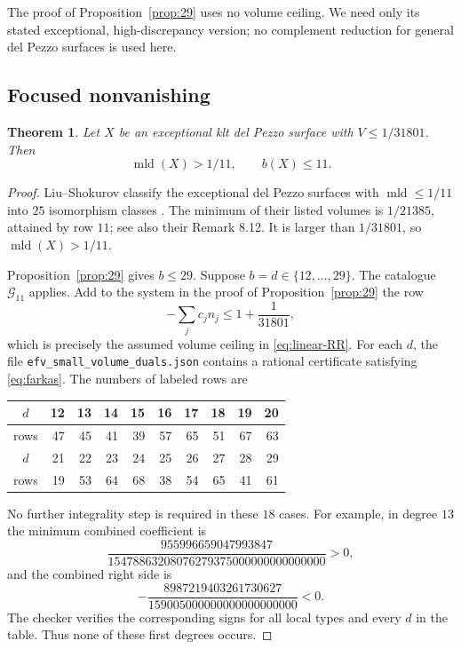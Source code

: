 \documentclass[12pt,a4paper]{article}
\numberwithin{equation}{section}
\newtheorem{theorem}{Theorem}[section]
\theoremstyle{definition}
\newcommand{\mld}{\operatorname{mld}}
\newcommand{\ccat}{\mathscr G}
\begin{document}
The proof of Proposition~\ref{prop:29} uses no volume ceiling.
We need only its stated exceptional, high-discrepancy version;
no complement reduction for general del Pezzo surfaces is used here.

\subsection{Focused nonvanishing}

\begin{theorem}\label{thm:focused}
Let \(X\) be an exceptional klt del Pezzo surface with
\(V\leq1/31801\). Then
\[
                         \mld(X)>1/11,\qquad b(X)\leq11.
\]
\end{theorem}

\begin{proof}
Liu--Shokurov classify the exceptional del Pezzo surfaces with
\(\mld\leq1/11\) into \(25\) isomorphism classes
\cite[Theorems 1.9 and 8.8, Table 8]{LS23}.
The minimum of their listed volumes is \(1/21385\), attained
by row \(11\); see also their Remark 8.12.
It is larger than \(1/31801\), so \(\mld(X)>1/11\).

Proposition~\ref{prop:29} gives \(b\leq29\).
Suppose \(b=d\in\{12,\ldots,29\}\).
The catalogue \(\ccat_{11}\) applies.
Add to the system in the proof of Proposition~\ref{prop:29} the row
\begin{equation}\label{eq:volume-ceiling}
                    -\sum_jc_jn_j\leq1+\frac1{31801},
\end{equation}
which is precisely the assumed volume ceiling in
\eqref{eq:linear-RR}.
For each \(d\), the file \texttt{efv\_small\_volume\_duals.json}
contains a rational certificate satisfying \eqref{eq:farkas}.
The numbers of labeled rows are
\begin{center}\small
\begin{tabular}{c|rrrrrrrrr}
\toprule
\(d\)&12&13&14&15&16&17&18&19&20\\
\midrule
rows&47&45&41&39&57&65&51&67&63\\
\midrule
\(d\)&21&22&23&24&25&26&27&28&29\\
\midrule
rows&19&53&64&68&38&54&65&41&61\\
\bottomrule
\end{tabular}
\end{center}
No further integrality step is required in these \(18\) cases.
For example, in degree \(13\) the minimum combined coefficient is
\[
 \frac{955996659047993847}
 {15478863208076279375000000000000000}>0,
\]
and the combined right side is
\[
 -\frac{8987219403261730627}{159005000000000000000000}<0.
\]
The checker verifies the corresponding signs for all local types
and every \(d\) in the table. Thus none of these first degrees occurs.
\end{proof}
\end{document}

